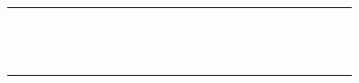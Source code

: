 \begin{table}
\begin{tabular}{p{4.5cm}*{26}{D}}
\anonstrut\textcolor{codelabel}{} &  & \X & \X & \X & \X &  &  &  &  &  &  & \X &  &  & \X &  & \X &  &  &  & \X & \X & \X &  &  &  \\
\anonstrut\textcolor{codelabel}{} & \X &  & \X &  &  &  &  &  &  & \X & \X &  & \X & \X & \X & \X & \X &  &  &  &  &  &  &  &  &  \\
\anonstrut\textcolor{codelabel}{} & \X &  &  & \X &  &  &  & \X &  & \X &  & \X &  &  & \X & \X & \X & \X &  &  &  &  &  &  & \X & \X \\
\anonstrut\textcolor{codelabel}{} & \X &  & \X &  & \X &  &  &  &  & \X &  & \X & \X &  &  &  &  &  &  &  &  &  &  &  &  &  \\
\anonstrut\textcolor{codelabel}{} &  & \X & \X & \X & \X &  &  &  &  & \X &  & \X &  & \X & \X &  &  &  &  &  &  &  &  & \X &  & \X \\
\anonstrut\textcolor{codelabel}{} & \X &  & \X & \X &  &  &  &  &  & \X &  &  &  &  & \X & \X & \X &  &  &  &  &  &  &  &  &  \\
\anonstrut\textcolor{codelabel}{} & \X &  &  & \X &  &  & \X &  &  &  &  &  &  &  &  &  &  &  &  &  &  &  &  &  &  &  \\
\anonstrut\textcolor{codelabel}{} & \X &  & \X & \X &  &  & \X &  &  & \X &  & \X &  & \X & \X & \X & \X &  &  &  &  &  &  &  &  & \X \\
\anonstrut\textcolor{codelabel}{} & \X &  &  &  & \X &  &  &  &  & \X &  & \X &  & \X & \X &  &  &  &  &  &  & \X &  &  &  & \X \\
\anonstrut\textcolor{codelabel}{} & \X &  & \X &  & \X &  &  &  &  & \X &  & \X &  & \X & \X & \X & \X &  &  &  &  &  &  &  &  & \X \\
\anonstrut\textcolor{codelabel}{} &  & \X & \X &  & \X &  &  &  &  &  &  & \X &  &  & \X &  &  &  &  &  & \X &  &  &  &  & \X \\
\anonstrut\textcolor{codelabel}{} & \X &  & \X &  & \X &  &  &  &  & \X &  & \X &  & \X & \X & \X & \X &  &  &  &  &  &  &  &  & \X \\
\citet{khakmardanComparativeLifeCycle2023} &  & \X & \X &  & \X &  & \X & \X &  & \X &  & \X &  & \X & \X &  & \X &  &  &  &  &  &  &  &  &  \\
\anonstrut\textcolor{codelabel}{} & \X &  &  &  & \X &  &  &  &  & \X &  & \X &  &  & \X & \X & \X &  &  &  &  &  &  &  &  &  \\
\bottomrule
\end{tabular}
\end{table}
\tagmcend
 
